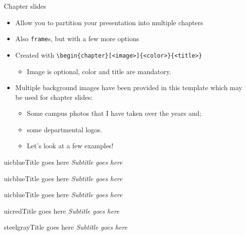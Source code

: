 \documentclass{beamer}
\begin{document}
\begin{frame}[fragile]{Chapter slides}
\begin{itemize}
\item Allow you to partition your presentation into multiple chapters
\item Also \verb|frame|s, but with a few more options
\item Created with \verb|\begin{chapter}[<image>]{<color>}{<title>}|
  \begin{itemize}
  \item Image is optional, color and title are mandatory.
  \end{itemize}
\item Multiple background images have been provided in this template which may be used for chapter slides:
  \begin{itemize}
  \item Some campus photos that I have taken over the years and;
  \item some departmental logos.
  \item Let's look at a few examples!
  \end{itemize}
\end{itemize}
\end{frame}


\begin{chapter}{uicblue}{Title goes here}
\textit{Subtitle goes here}
\end{chapter}

\begin{chapter}{uicblue}{Title goes here}
\textit{Subtitle goes here}
\end{chapter}

\begin{chapter}{uicblue}{Title goes here}
\textit{Subtitle goes here}
\end{chapter}

\begin{chapter}{uicred}{Title goes here}
\textit{Subtitle goes here}
\end{chapter}

\begin{chapter}{steelgray}{Title goes here}
\textit{Subtitle goes here}
\end{chapter}
\end{document}
